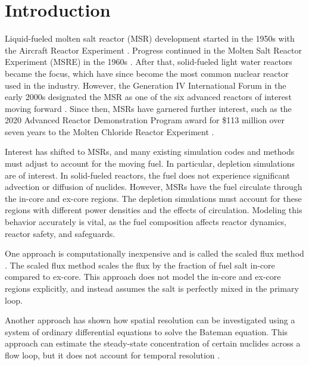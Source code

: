 \documentclass{style/nseJournal}
\providecommand{\DIFadd}[1]{{\protect\color{blue}\uwave{#1}}} %
\providecommand{\DIFaddbegin}{} %
\providecommand{\DIFaddend}{} %
\begin{document}
\section{Introduction}\label{sec:1}

Liquid-fueled molten salt reactor (MSR) development started in the 1950s with the Aircraft Reactor Experiment \cite{bettis_aircraft_1957}.
Progress continued in the Molten Salt Reactor Experiment (MSRE) in the 1960s \cite{haubenreich_experience_1970}.
After that, solid-fueled light water reactors became the focus, which have since become the most common nuclear reactor used in the industry.
However, the Generation IV International Forum in the early 2000s designated the MSR as one of the six advanced reactors of interest moving forward \cite{kelly_generation_2014}.
Since then, MSRs have garnered further interest, such as the 2020 Advanced Reactor Demonstration Program award for \$113 million over seven years to the Molten Chloride Reactor Experiment \DIFaddbegin \DIFadd{\mbox{%
\cite{doeardpmcre}}\hskip0pt%
}\DIFaddend .

Interest has shifted to MSRs, and many existing simulation codes and methods must adjust to account for the moving fuel.
In particular, depletion simulations are of interest.
In solid-fueled reactors, the fuel does not experience significant advection or diffusion of nuclides.
However, MSRs have the fuel circulate through the in-core and ex-core regions.
The depletion simulations must account for these regions with different power densities and the effects of circulation.
Modeling this behavior accurately is vital, as the fuel composition affects reactor dynamics, reactor safety, and safeguards.

One approach is computationally inexpensive and is called the scaled flux method \cite{betzler2021liquid}.
The scaled flux method scales the flux by the fraction of fuel salt in-core compared to ex-core.
This approach does not model the in-core and ex-core regions explicitly, and instead assumes the salt is perfectly mixed in the primary loop.

Another approach has shown how spatial resolution can be investigated using a system of ordinary differential equations to solve the Bateman equation.
This approach can estimate the steady-state concentration of certain nuclides across a flow loop, but it does not account for temporal resolution \cite{shahbazi_steady-state_2022}.
\end{document}
